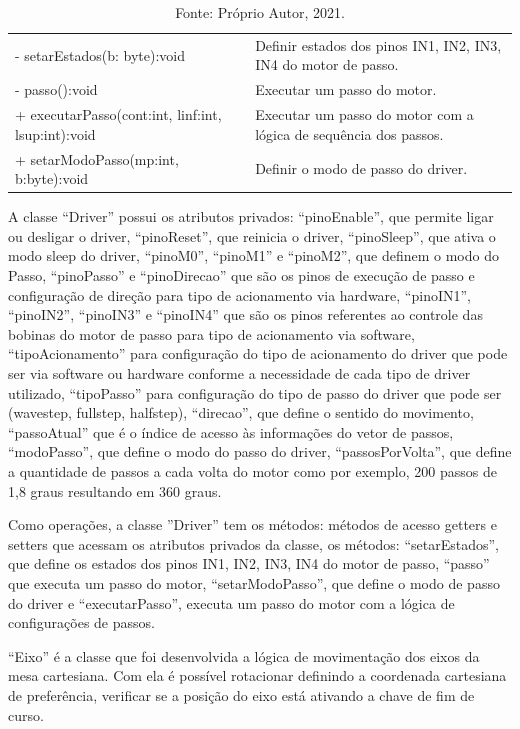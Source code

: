 \begin{table}
\begin{tabular}{lp{6cm}}
        - setarEstados(b: byte):void & Definir estados dos pinos IN1, IN2, IN3, IN4 do motor de passo.\\
        - passo():void & Executar um passo do motor.\\
        + executarPasso(cont:int, linf:int, lsup:int):void & Executar um passo do motor com a lógica de sequência dos passos.\\
        + setarModoPasso(mp:int, b:byte):void & Definir o modo de passo do driver.\\
        \hline       
    \end{tabular}
    \caption*{Fonte: Próprio Autor, 2021.}
    \label{tab:classedriver}
\end{table}

A classe “Driver” possui os atributos privados: “pinoEnable”, que permite ligar ou desligar o driver, 
“pinoReset”, que reinicia o driver, “pinoSleep”, que ativa o modo sleep do driver, “pinoM0”, “pinoM1” 
e “pinoM2”, que definem o modo do Passo, “pinoPasso” e “pinoDirecao” que são os pinos de execução de 
passo e configuração de direção para tipo de acionamento via hardware, “pinoIN1”, “pinoIN2”, “pinoIN3” 
e “pinoIN4” que são os pinos referentes ao controle das bobinas do motor de passo para tipo de acionamento 
via software, “tipoAcionamento” para configuração do tipo de acionamento do driver que pode ser via software 
ou hardware conforme a necessidade de cada tipo de driver utilizado, “tipoPasso” para configuração do tipo 
de passo do driver que pode ser (wavestep, fullstep, halfstep), “direcao”, que define o sentido do movimento, 
“passoAtual” que é o índice de acesso às informações do vetor de passos, “modoPasso”, que define o modo do 
passo do driver, “passosPorVolta”, que define a quantidade de passos a cada volta do motor como por exemplo, 
200 passos de 1,8 graus resultando em 360 graus. 

Como operações, a classe ”Driver” tem os métodos: métodos de acesso getters e setters que acessam os 
atributos privados da classe, os métodos: “setarEstados”, que define os estados dos pinos IN1, IN2, IN3, 
IN4 do motor de passo, “passo” que executa um passo do motor, “setarModoPasso”, que define o modo de passo 
do driver e “executarPasso”, executa um passo do motor com a lógica de configurações de passos.

“Eixo” é a classe que foi desenvolvida a lógica de movimentação dos eixos da mesa cartesiana. Com ela é 
possível rotacionar definindo a coordenada cartesiana de preferência, verificar se a posição do eixo 
está ativando a chave de fim de curso.

